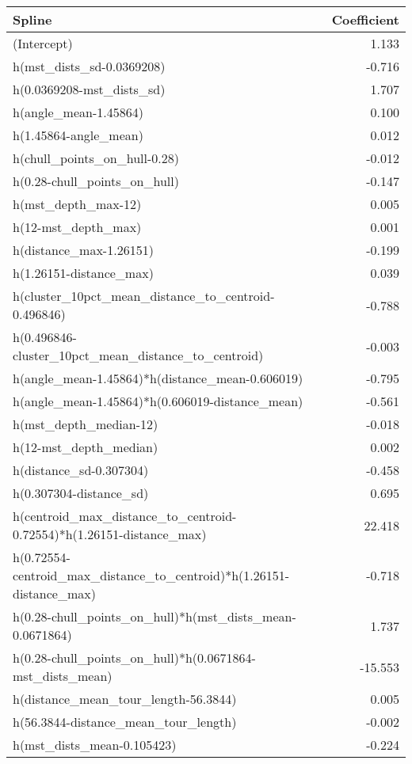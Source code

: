 \documentclass{article}
\begin{document}
\begin{table}
  \centering
  \begin{tabular}{lr}
  \toprule
Spline & Coefficient \\ 
  \midrule
(Intercept) & 1.133 \\ 
  h(mst\_dists\_sd-0.0369208) & -0.716 \\ 
  h(0.0369208-mst\_dists\_sd) & 1.707 \\ 
  h(angle\_mean-1.45864) & 0.100 \\ 
  h(1.45864-angle\_mean) & 0.012 \\ 
  h(chull\_points\_on\_hull-0.28) & -0.012 \\ 
  h(0.28-chull\_points\_on\_hull) & -0.147 \\ 
  h(mst\_depth\_max-12) & 0.005 \\ 
  h(12-mst\_depth\_max) & 0.001 \\ 
  h(distance\_max-1.26151) & -0.199 \\ 
  h(1.26151-distance\_max) & 0.039 \\ 
  h(cluster\_10pct\_mean\_distance\_to\_centroid-0.496846) & -0.788 \\ 
  h(0.496846-cluster\_10pct\_mean\_distance\_to\_centroid) & -0.003 \\ 
  h(angle\_mean-1.45864)*h(distance\_mean-0.606019) & -0.795 \\ 
  h(angle\_mean-1.45864)*h(0.606019-distance\_mean) & -0.561 \\ 
  h(mst\_depth\_median-12) & -0.018 \\ 
  h(12-mst\_depth\_median) & 0.002 \\ 
  h(distance\_sd-0.307304) & -0.458 \\ 
  h(0.307304-distance\_sd) & 0.695 \\ 
  h(centroid\_max\_distance\_to\_centroid-0.72554)*h(1.26151-distance\_max) & 22.418 \\ 
  h(0.72554-centroid\_max\_distance\_to\_centroid)*h(1.26151-distance\_max) & -0.718 \\ 
  h(0.28-chull\_points\_on\_hull)*h(mst\_dists\_mean-0.0671864) & 1.737 \\ 
  h(0.28-chull\_points\_on\_hull)*h(0.0671864-mst\_dists\_mean) & -15.553 \\ 
  h(distance\_mean\_tour\_length-56.3844) & 0.005 \\ 
  h(56.3844-distance\_mean\_tour\_length) & -0.002 \\ 
  h(mst\_dists\_mean-0.105423) & -0.224 \\ 

\end{tabular}
\end{table}
\end{document}
